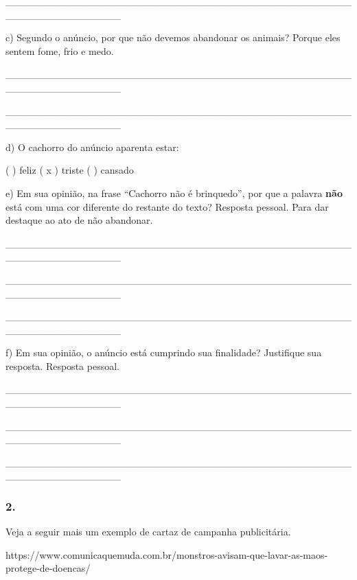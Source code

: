 \_\_\_\_\_\_\_\_\_\_\_\_\_\_\_\_\_\_\_\_\_\_\_\_\_\_\_\_\_\_\_\_\_\_\_\_\_\_\_\_\_\_\_\_\_\_\_\_\_\_\_\_\_\_\_\_\_\_\_\_\_\_\_\_

c) Segundo o anúncio, por que não devemos abandonar os animais? Porque
eles sentem fome, frio e medo.

\_\_\_\_\_\_\_\_\_\_\_\_\_\_\_\_\_\_\_\_\_\_\_\_\_\_\_\_\_\_\_\_\_\_\_\_\_\_\_\_\_\_\_\_\_\_\_\_\_\_\_\_\_\_\_\_\_\_\_\_\_\_\_\_

\_\_\_\_\_\_\_\_\_\_\_\_\_\_\_\_\_\_\_\_\_\_\_\_\_\_\_\_\_\_\_\_\_\_\_\_\_\_\_\_\_\_\_\_\_\_\_\_\_\_\_\_\_\_\_\_\_\_\_\_\_\_\_\_

d) O cachorro do anúncio aparenta estar:

( ) feliz ( x ) triste ( ) cansado

e) Em sua opinião, na frase ``Cachorro não é brinquedo'', por que a
palavra \textbf{não} está com uma cor diferente do restante do texto?
Resposta pessoal. Para dar destaque ao ato de não abandonar.

\_\_\_\_\_\_\_\_\_\_\_\_\_\_\_\_\_\_\_\_\_\_\_\_\_\_\_\_\_\_\_\_\_\_\_\_\_\_\_\_\_\_\_\_\_\_\_\_\_\_\_\_\_\_\_\_\_\_\_\_\_\_\_\_

\_\_\_\_\_\_\_\_\_\_\_\_\_\_\_\_\_\_\_\_\_\_\_\_\_\_\_\_\_\_\_\_\_\_\_\_\_\_\_\_\_\_\_\_\_\_\_\_\_\_\_\_\_\_\_\_\_\_\_\_\_\_\_\_

\_\_\_\_\_\_\_\_\_\_\_\_\_\_\_\_\_\_\_\_\_\_\_\_\_\_\_\_\_\_\_\_\_\_\_\_\_\_\_\_\_\_\_\_\_\_\_\_\_\_\_\_\_\_\_\_\_\_\_\_\_\_\_\_

f) Em sua opinião, o anúncio está cumprindo sua finalidade? Justifique
sua resposta. Resposta pessoal.

\_\_\_\_\_\_\_\_\_\_\_\_\_\_\_\_\_\_\_\_\_\_\_\_\_\_\_\_\_\_\_\_\_\_\_\_\_\_\_\_\_\_\_\_\_\_\_\_\_\_\_\_\_\_\_\_\_\_\_\_\_\_\_\_

\_\_\_\_\_\_\_\_\_\_\_\_\_\_\_\_\_\_\_\_\_\_\_\_\_\_\_\_\_\_\_\_\_\_\_\_\_\_\_\_\_\_\_\_\_\_\_\_\_\_\_\_\_\_\_\_\_\_\_\_\_\_\_\_

\_\_\_\_\_\_\_\_\_\_\_\_\_\_\_\_\_\_\_\_\_\_\_\_\_\_\_\_\_\_\_\_\_\_\_\_\_\_\_\_\_\_\_\_\_\_\_\_\_\_\_\_\_\_\_\_\_\_\_\_\_\_\_\_

\subsubsection{2. }\label{section-40}

Veja a seguir mais um exemplo de cartaz de campanha publicitária.

https://www.comunicaquemuda.com.br/monstros-avisam-que-lavar-as-maos-protege-de-doencas/

